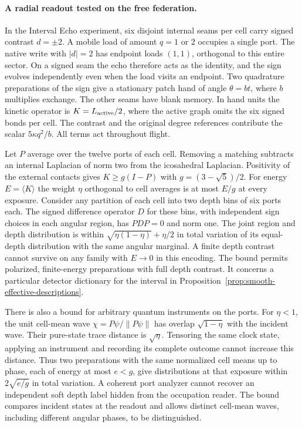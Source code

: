 \documentclass[11pt]{article}
\begin{document}
\paragraph{A radial readout tested on the free federation.}
In the Interval Echo experiment, six disjoint internal seams per cell carry
signed contrast $d=\pm2$. A mobile load of amount $q=1$ or $2$ occupies a
single port. The native write with $|d|=2$ has endpoint loads $(1,1)$,
orthogonal to this entire sector. On a signed seam the echo therefore acts
as the identity, and the sign evolves independently even when the load visits
an endpoint. Two quadrature preparations of the sign give a stationary patch
hand of angle $\theta=bt$, where $b$ multiplies exchange. The other seams
have blank memory. In hand units the kinetic operator is $K=L_{\rm active}/2$,
where the active graph omits the six signed bonds per cell. The contrast and
the original degree references contribute the scalar $5\kappa q^2/b$.
All terms act throughout flight.

Let $P$ average over the twelve ports of each cell. Removing a matching
subtracts an internal Laplacian of norm two from the icosahedral Laplacian.
Positivity of the external contacts gives
$K\geq g(I-P)$ with $g=(3-\sqrt{5})/2$. For energy $E=\langle K\rangle$
the weight $\eta$ orthogonal to cell averages is at most $E/g$ at every
exposure. Consider any partition of each cell into two depth bins of six
ports each. The signed difference operator $D$ for these bins, with
independent sign choices in each angular region, has $PDP=0$ and norm one.
The joint region and depth distribution is within
$\sqrt{\eta(1-\eta)}+\eta/2$ in total variation of its equal-depth
distribution with the same angular marginal. A finite depth contrast cannot
survive on any family with $E\to0$ in this encoding. The bound permits
polarized, finite-energy preparations with full depth contrast. It concerns
a particular detector dictionary for the interval in
Proposition~\ref{prop:smooth-effective-descriptions}.

There is also a bound for arbitrary quantum instruments on the ports.
For $\eta<1$, the unit cell-mean wave $\chi=P\psi/\|P\psi\|$ has overlap
$\sqrt{1-\eta}$ with the incident wave. Their pure-state trace distance
is $\sqrt{\eta}$. Tensoring the same clock state, applying an instrument
and recording its complete outcome cannot increase this distance. Thus two
preparations with the same normalized cell means up to phase, each of energy
at most $e<g$, give distributions at that exposure within
$2\sqrt{e/g}$ in total variation. A coherent port analyzer cannot recover
an independent soft depth label hidden from the occupation reader. The
bound compares incident states at the readout and allows distinct cell-mean
waves, including different angular phases, to be distinguished.
\end{document}
